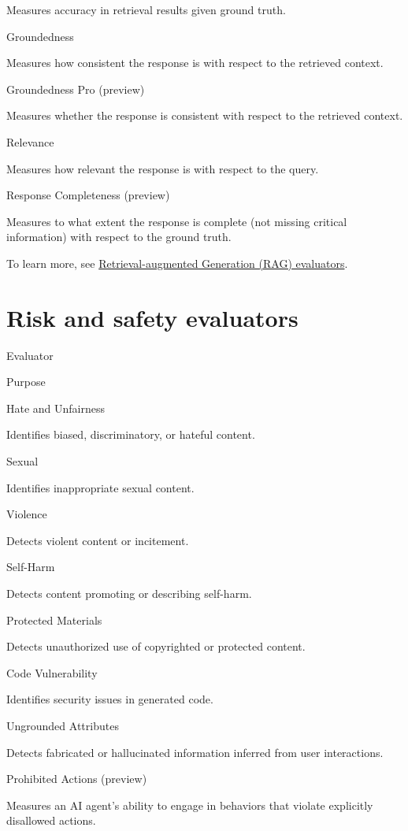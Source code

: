 \documentclass[
  letterpaper,
  DIV=11,
  numbers=noendperiod,
  oneside]{scrreprt}
\begin{document}
\begin{tcolorbox}
Measures accuracy in retrieval results given ground truth.

Groundedness

Measures how consistent the response is with respect to the retrieved
context.

Groundedness Pro (preview)

Measures whether the response is consistent with respect to the
retrieved context.

Relevance

Measures how relevant the response is with respect to the query.

Response Completeness (preview)

Measures to what extent the response is complete (not missing critical
information) with respect to the ground truth.

To learn more, see
\href{https://learn.microsoft.com/en-us/azure/foundry/concepts/evaluation-evaluators/rag-evaluators}{Retrieval-augmented
Generation (RAG) evaluators}.

\section{Risk and safety evaluators}\label{risk-and-safety-evaluators}

Evaluator

Purpose

Hate and Unfairness

Identifies biased, discriminatory, or hateful content.

Sexual

Identifies inappropriate sexual content.

Violence

Detects violent content or incitement.

Self-Harm

Detects content promoting or describing self-harm.

Protected Materials

Detects unauthorized use of copyrighted or protected content.

Code Vulnerability

Identifies security issues in generated code.

Ungrounded Attributes

Detects fabricated or hallucinated information inferred from user
interactions.

Prohibited Actions (preview)

Measures an AI agent's ability to engage in behaviors that violate
explicitly disallowed actions.


\end{tcolorbox}
\end{document}
